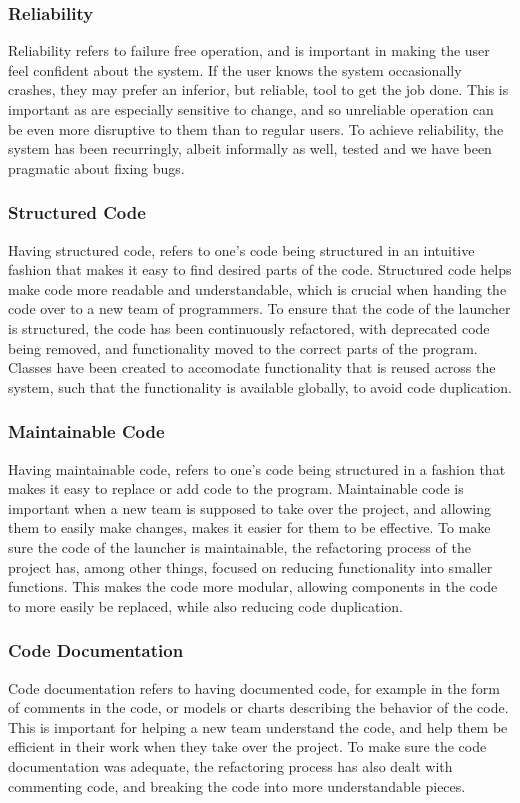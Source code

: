 \subsubsection{Reliability}
Reliability refers to failure free operation, and is important in making the user feel confident about the system. 
If the user knows the system occasionally crashes, they may prefer an inferior, but reliable, tool to get the job done. 
This is important as \autists[] are especially sensitive to change, and so unreliable operation can be even more disruptive to them than to regular users. 
To achieve reliability, the system has been recurringly, albeit informally as well, tested and we have been pragmatic about fixing bugs.

\subsubsection{Structured Code}
Having structured code, refers to one's code being structured in an intuitive fashion that makes it easy to find desired parts of the code. 
Structured code helps make code more readable and understandable, which is crucial when handing the code over to a new team of programmers. 
To ensure that the code of the launcher is structured, the code has been continuously refactored, with deprecated code being removed, and functionality moved to the correct parts of the program. 
Classes have been created to accomodate functionality that is reused across the system, such that the functionality is available globally, to avoid code duplication. 

\subsubsection{Maintainable Code}
Having maintainable code, refers to one's code being structured in a fashion that makes it easy to replace or add code to the program. 
Maintainable code is important when a new team is supposed to take over the project, and allowing them to easily make changes, makes it easier for them to be effective. 
To make sure the code of the launcher is maintainable, the refactoring process of the project has, among other things, focused on reducing functionality into smaller functions. 
This makes the code more modular, allowing components in the code to more easily be replaced, while also reducing code duplication. 

\subsubsection{Code Documentation}
Code documentation refers to having documented code, for example in the form of comments in the code, or models or charts describing the behavior of the code. 
This is important for helping a new team understand the code, and help them be efficient in their work when they take over the project. 
To make sure the code documentation was adequate, the refactoring process has also dealt with commenting code, and breaking the code into more understandable pieces. 

